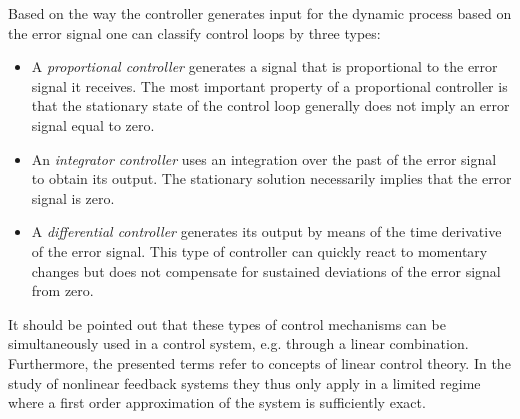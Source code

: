 \documentclass[10pt,a4paper]{article}
\begin{document}
Based on the way the controller generates input for the dynamic process based on the error signal one can classify control loops by three types:
\newpage
\begin{itemize}
\item A \textit{proportional controller} generates a signal that is proportional to the error signal it receives. The most important property of a proportional controller is that the stationary state of the control loop generally does not imply an error signal equal to zero.
\item An \textit{integrator controller} uses an integration over the past of the error signal to obtain its output. The stationary solution necessarily implies that the error signal is zero.
\item A \textit{differential controller} generates its output by means of the time derivative of the error signal. This type of controller can quickly react to momentary changes but does not compensate for sustained deviations of the error signal from zero.
\end{itemize}
It should be pointed out that these types of control mechanisms can be simultaneously used in a control system, e.g. through a linear combination. Furthermore, the presented terms refer to concepts of linear control theory. In the study of nonlinear feedback systems they thus only apply in a limited regime where a first order approximation of the system is sufficiently exact.
\end{document}
